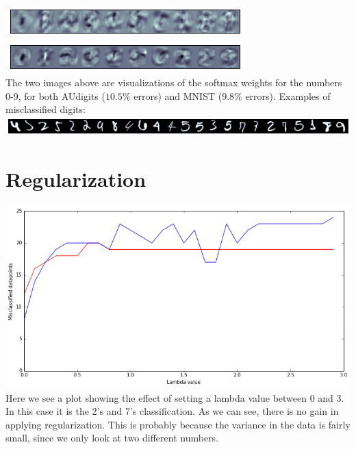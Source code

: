\documentclass[a4paper,10pt,article,oneside,english]{memoir}
\begin{document}
\noindent\includegraphics[width=1\linewidth]{nll_pict5.png}\\
\noindent\includegraphics[width=1\linewidth]{sm_pict2.png}\\
The two images above are visualizations of the softmax weights for the numbers 0-9, for both AUdigits ($10.5\%$ errors) and MNIST ($9.8\%$ errors). Examples of misclassified digits:\\
\noindent\includegraphics[width=1\linewidth]{nll_pict7_168.png}\\

\section{Regularization}\label{sec:reg}
\hspace{0.1\linewidth}\includegraphics[width=0.8\linewidth]{nll_plot3.png}\\
Here we see a plot showing the effect of setting a lambda value between 0 and 3. In this case it is the 2's and 7's classification. As we can see, there is no gain in applying regularization. This is probably because the variance in the data is fairly small, since we only look at two different numbers.
\end{document}
